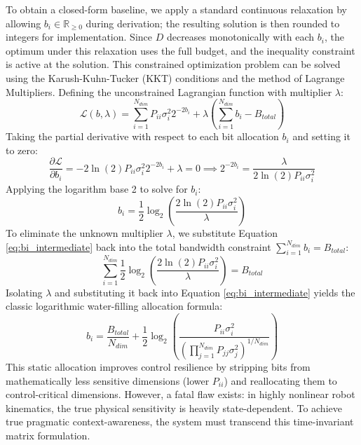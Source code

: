 To obtain a closed-form baseline, we apply a standard continuous relaxation by allowing $b_i \in \mathbb{R}_{\ge 0}$ during derivation; the resulting solution is then rounded to integers for implementation. Since $D$ decreases monotonically with each $b_i$, the optimum under this relaxation uses the full budget, and the inequality constraint is active at the solution. This constrained optimization problem can be solved using the Karush-Kuhn-Tucker (KKT) conditions and the method of Lagrange Multipliers. Defining the unconstrained Lagrangian function with multiplier $\lambda$:
\begin{equation}
    \mathcal{L}(b, \lambda) = \sum_{i=1}^{N_{dim}} P_{ii} \sigma_i^2 2^{-2b_i} + \lambda \left( \sum_{i=1}^{N_{dim}} b_i - B_{total} \right)
\end{equation}
Taking the partial derivative with respect to each bit allocation $b_i$ and setting it to zero:
\begin{equation} \label{eq:partial_derivative}
    \frac{\partial \mathcal{L}}{\partial b_i} = -2 \ln(2) P_{ii} \sigma_i^2 2^{-2b_i} + \lambda = 0 \implies 2^{-2b_i} = \frac{\lambda}{2 \ln(2) P_{ii} \sigma_i^2}
\end{equation}
Applying the logarithm base 2 to solve for $b_i$:
\begin{equation} \label{eq:bi_intermediate}
    b_i = \frac{1}{2} \log_2 \left( \frac{2 \ln(2) P_{ii} \sigma_i^2}{\lambda} \right)
\end{equation}
To eliminate the unknown multiplier $\lambda$, we substitute Equation \ref{eq:bi_intermediate} back into the total bandwidth constraint $\sum_{i=1}^{N_{dim}} b_i = B_{total}$:
\begin{equation}
    \sum_{i=1}^{N_{dim}} \frac{1}{2} \log_2 \left( \frac{2 \ln(2) P_{ii} \sigma_i^2}{\lambda} \right) = B_{total}
\end{equation}
Isolating $\lambda$ and substituting it back into Equation \ref{eq:bi_intermediate} yields the classic logarithmic water-filling allocation formula:
\begin{equation} \label{eq:lqr_waterfilling}
    b_i = \frac{B_{total}}{N_{dim}} + \frac{1}{2} \log_2 \left( \frac{P_{ii} \sigma_i^2}{\left( \prod_{j=1}^{N_{dim}} P_{jj} \sigma_j^2 \right)^{1/N_{dim}}} \right)
\end{equation}
This static allocation improves control resilience by stripping bits from mathematically less sensitive dimensions (lower $P_{ii}$) and reallocating them to control-critical dimensions. However, a fatal flaw exists: in highly nonlinear robot kinematics, the true physical sensitivity is heavily state-dependent. To achieve true pragmatic context-awareness, the system must transcend this time-invariant matrix formulation.

